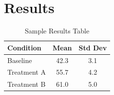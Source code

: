 
\section{Results}
\label{sec:results}

\lipsum[5]

\begin{table}[H]
  \centering
  \caption{Sample Results Table}
  \label{tab:results}
  \begin{tabular}{lcc}
    \toprule
    \textbf{Condition} & \textbf{Mean} & \textbf{Std Dev} \\
    \midrule
    Baseline & 42.3 & 3.1 \\
    Treatment A & 55.7 & 4.2 \\
    Treatment B & 61.0 & 5.0 \\
    \bottomrule
  \end{tabular}
\end{table}
